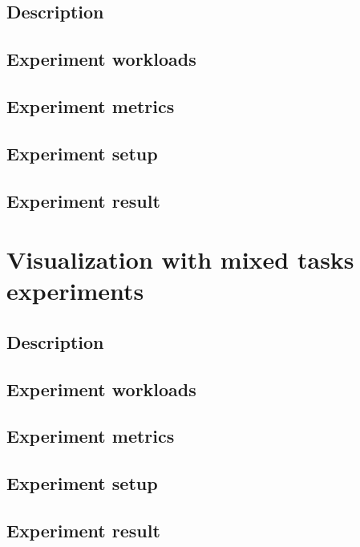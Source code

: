 \subsection{Description}
\subsection{Experiment workloads}
\subsection{Experiment metrics}
\subsection{Experiment setup}
\subsection{Experiment result}
\section{Visualization with mixed tasks experiments}
\subsection{Description}
\subsection{Experiment workloads}
\subsection{Experiment metrics}
\subsection{Experiment setup}
\subsection{Experiment result}
